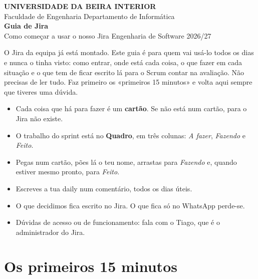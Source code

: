\documentclass[11pt,a4paper]{article}
\begin{document}
\thispagestyle{primeira}

\begin{tcolorbox}[colback=azul, colframe=azul, coltext=white, arc=3pt, boxrule=0pt,
    left=16pt, right=16pt, top=14pt, bottom=14pt]
  \sffamily
  {\footnotesize\bfseries\MakeUppercase{Universidade da Beira Interior}}\\[2pt]
  {\footnotesize Faculdade de Engenharia \textperiodcentered{} Departamento de Informática}\\[16pt]
  {\fontsize{28}{32}\selectfont\bfseries Guia de Jira}\\[4pt]
  {\large Como começar a usar o nosso Jira \textperiodcentered{} Engenharia de Software 2026/27}
\end{tcolorbox}

O Jira da equipa já está montado. Este guia é para quem vai usá-lo todos os dias e nunca o tinha visto: como entrar, onde está cada coisa, o que fazer em cada situação e o que tem de ficar escrito lá para o Scrum contar na avaliação. Não precisas de ler tudo. Faz primeiro os «primeiros 15 minutos» e volta aqui sempre que tiveres uma dúvida.

\begin{tcolorbox}[caixa, title={O essencial em poucas linhas}, colback=azulclaro!60]
  \begin{itemize}
    \item Cada coisa que há para fazer é um \textbf{cartão}. Se não está num cartão, para o Jira não existe.
    \item O trabalho do sprint está no \textbf{Quadro}, em três colunas: \textit{A fazer}, \textit{Fazendo} e \textit{Feito}.
    \item Pegas num cartão, pões lá o teu nome, arrastas para \textit{Fazendo} e, quando estiver mesmo pronto, para \textit{Feito}.
    \item Escreves a tua daily num comentário, todos os dias úteis.
    \item O que decidimos fica escrito no Jira. O que fica só no WhatsApp perde-se.
    \item Dúvidas de acesso ou de funcionamento: fala com o Tiago, que é o administrador do Jira.
  \end{itemize}
\end{tcolorbox}

\section{Os primeiros 15 minutos}
\end{document}
